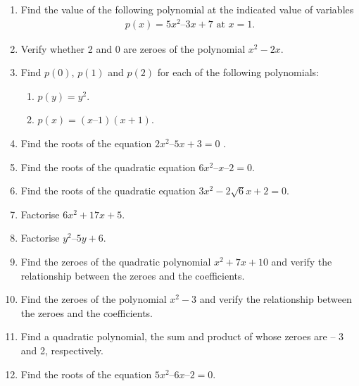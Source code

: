 \renewcommand{\theequation}{\theenumi}
\begin{enumerate}[label=\arabic*.,ref=\thesubsection.\theenumi]
%
%
\item Find the value of  the following polynomial at the indicated value of variables 
\begin{align}
p(x) = 5x^2– 3x + 7 \text{  at } x = 1.
\end{align}
\item Verify whether 2 and 0 are zeroes of the polynomial $x^2-2x$.
\item Find $p(0)$, $p(1)$ and $p(2)$ for each of the following polynomials: 
\begin{enumerate}
\item $p(y) = y^2$. 
\item $p(x) = (x – 1) (x + 1)$.
\end{enumerate}
\item Find the roots of the equation  $2x^2– 5x + 3 = 0$ .
\item Find the roots of the quadratic equation $6x^2– x – 2 = 0.$
\item Find the roots of the quadratic equation $3x^2 -2 \sqrt{6}x+ 2 = 0$.
%
%
\item Factorise $6x^2+ 17x + 5$.
\item Factorise $y^2 – 5y + 6$.
\item Find the zeroes of the quadratic polynomial $x^2+7x+10$ and verify the relationship between the zeroes and the coefficients.
\item Find the zeroes of the polynomial $x^2-3$ and verify the relationship between the zeroes and the coefficients.
\item Find a quadratic polynomial, the sum and product of whose zeroes are – 3 and 2, respectively.
%
\item Find the roots of the equation $5x^2  – 6x – 2 = 0 $.

\end{enumerate}
